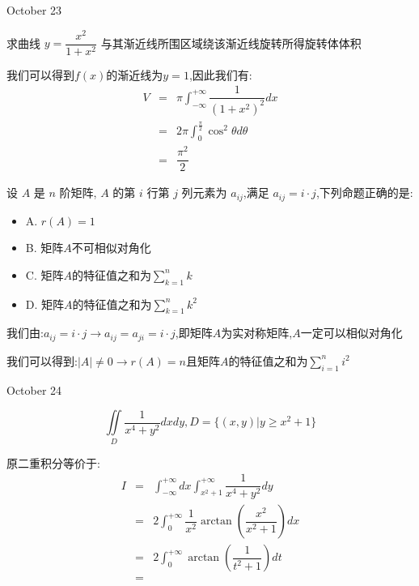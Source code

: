 \textcolor{purplea}{October 23}

\begin{example}[][Exam: 36.4.3]
	求曲线 $y=\dfrac{x^2}{1+x^2}$ 与其渐近线所围区域绕该渐近线旋转所得旋转体体积
\end{example}

\begin{solution}

	我们可以得到$f(x)$的渐近线为$y=1$,因此我们有:
	\begin{eqnarray*}
		V&=&\pi\int_{-\infty}^{+\infty}\dfrac{1}{(1+x^2)^2}dx\\
		&=&2\pi\int_{0}^{\frac{\pi}{2}}\cos^2\theta d\theta\\
		&=&\dfrac{\pi^2}{2}
	\end{eqnarray*}
\end{solution}

\begin{example}[][Exam: 36.4.4]
	设 $A$ 是 $n$ 阶矩阵, $A$ 的第 $i$ 行第 $j$ 列元素为 $a_{ij}$,满足 $a_{ij}=i\cdot j$,下列命题正确的是:  
\begin{itemize}
	\item A. $r(A)=1$
	\item B. 矩阵$A$不可相似对角化
	\item C. 矩阵$A$的特征值之和为$\sum\limits_{k=1}^{n}k$
	\item D. 矩阵$A$的特征值之和为$\sum\limits_{k=1}^{n}k^2$
\end{itemize}
\end{example}

\begin{solution}

	我们由:$a_{ij}=i\cdot j\to a_{ij}=a_{ji}=i\cdot j$,即矩阵$A$为实对称矩阵,$A$一定可以相似对角化
	
	我们可以得到:$|A|\neq 0\to r(A)=n$且矩阵$A$的特征值之和为$\sum\limits_{i=1}^{n}i^2$
\end{solution}


\textcolor{purplea}{October 24}

\begin{example}[][Exam: 36.4.5]
	$$\iint\limits_{D}\dfrac{1}{x^4+y^2}dxdy, D=\{(x,y)|y\geq x^2+1\}$$
\end{example}
\begin{solution}

	原二重积分等价于:
	\begin{eqnarray*}
		I&=&\int_{-\infty}^{+\infty}dx\int_{x^2+1}^{+\infty}\dfrac{1}{x^4+y^2}dy\\
		&=&2\int_{0}^{+\infty}\dfrac{1}{x^2}\arctan(\dfrac{x^2}{x^2+1})dx\\
		&=&2\int_{0}^{+\infty}\arctan(\dfrac{1}{t^2+1})dt\\
		&=&
	\end{eqnarray*}
\end{solution}

